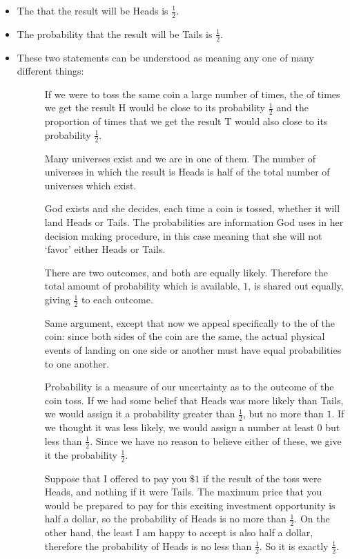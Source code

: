\begin{itemize}
\item
The  that the result will be Heads is $\frac{1}{2}$.
\item
The probability that the result will be Tails is $\frac{1}{2}$.
\item
These two statements can be understood as meaning any one of many different things:
\begin{description}
\item[]
If we were to toss the same coin a large number of times, the  of times we get the result H would be close to its probability $\frac{1}{2}$ and the proportion of times that we get the result T would also close to its probability $\frac{1}{2}$.
\item[]
Many universes exist and we are in one of them. The number of universes in which the result is Heads is half of the total number of universes which exist.
\item[]
God exists and she decides, each time a coin is tossed, whether it will land Heads or Tails. The probabilities are information God uses in her decision making procedure, in this case meaning that she will not `favor' either Heads or Tails.
\item[]
There are two outcomes, and both are equally likely. Therefore the total amount of probability which is available, $1$, is shared out equally, giving $\frac{1}{2}$ to each outcome.
\item[]
Same argument, except that now we appeal specifically to the  of the coin: since both sides of the coin are the same, the actual physical events of landing on one side or another must have equal probabilities to one another.
\item[]
Probability is a measure of our uncertainty as to the outcome of the coin toss. If we had some belief that Heads was more likely than Tails, we would assign it a probability greater than $\frac{1}{2}$, but no more than $1$. If we thought it was less likely, we would assign a number at least $0$ but less than $\frac{1}{2}$. Since we have no reason to believe either of these, we give it the probability $\frac{1}{2}$.
\item[]
Suppose that I offered to pay you $\$1$ if the result of the toss were Heads, and nothing if it were Tails. The maximum price that you would be prepared to pay for this exciting investment opportunity is half a dollar, so the probability of Heads is no more than $\frac{1}{2}$. On the other hand, the least I am happy to accept is also half a dollar, therefore the probability of Heads is no less than $\frac{1}{2}$. So it is exactly $\frac{1}{2}$.
\end{description}
\end{itemize}
